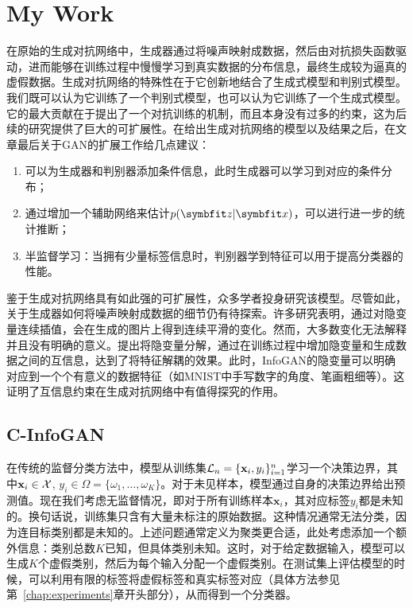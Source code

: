 \chapter{My Work}\label{chap:c-infogan}
在原始的生成对抗网络中，生成器通过将噪声映射成数据，然后由对抗损失函数驱动，进而能够在训练过程中慢慢学习到真实数据的分布信息，最终生成较为逼真的虚假数据。生成对抗网络的特殊性在于它创新地结合了生成式模型和判别式模型。我们既可以认为它训练了一个判别式模型，也可以认为它训练了一个生成式模型。它的最大贡献在于提出了一个对抗训练的机制，而且本身没有过多的约束，这为后续的研究提供了巨大的可扩展性。\citet{goodfellow2014generative}在给出生成对抗网络的模型以及结果之后，在文章最后关于GAN的扩展工作给几点建议：
\begin{enumerate}
  \item 可以为生成器和判别器添加条件信息，此时生成器可以学习到对应的条件分布；
  \item 通过增加一个辅助网络来估计$p(\bd{z}|\bd{x})$，可以进行进一步的统计推断；
  \item 半监督学习：当拥有少量标签信息时，判别器学到特征可以用于提高分类器的性能。
\end{enumerate}

鉴于生成对抗网络具有如此强的可扩展性，众多学者投身研究该模型\citep{mirza2014conditional,radford2015unsupervised,chen2016infogan,chongxuan2017triple,mao2017least}。尽管如此，关于生成器如何将噪声映射成数据的细节仍有待探索。许多研究表明，通过对隐变量连续插值，会在生成的图片上得到连续平滑的变化\citep{radford2015unsupervised,chen2016infogan,dumoulin2016adversarially,miyato2018cgans}。然而，大多数变化无法解释并且没有明确的意义。\citet{chen2016infogan}提出将隐变量分解，通过在训练过程中增加隐变量和生成数据之间的互信息，达到了将特征解耦的效果。此时，InfoGAN的隐变量可以明确对应到一个个有意义的数据特征（如MNIST中手写数字的角度、笔画粗细等）。这证明了互信息约束在生成对抗网络中有值得探究的作用。

\section{C-InfoGAN}\label{sec:c-infogan}
在传统的监督分类方法中，模型从训练集$\mathcal{L}_n = \{\mathbf{x}_i, y_i\}_{i=1}^n$学习一个决策边界，其中$\mathbf{x}_i \in \mathcal{X}$, $y_i \in \Omega = \{\omega_1, \dots, \omega_K\}$。对于未见样本，模型通过自身的决策边界给出预测值。现在我们考虑无监督情况，即对于所有训练样本$\mathbf{x}_i$，其对应标签$y_i$都是未知的。换句话说，训练集只含有大量未标注的原始数据。这种情况通常无法分类，因为连目标类别都是未知的。上述问题通常定义为聚类更合适，此处考虑添加一个额外信息：类别总数$K$已知，但具体类别未知。这时，对于给定数据输入，模型可以生成$K$个虚假类别，然后为每个输入分配一个虚假类别。在测试集上评估模型的时候，可以利用有限的标签将虚假标签和真实标签对应（具体方法参见第~\ref{chap:experiments}章开头部分），从而得到一个分类器。

